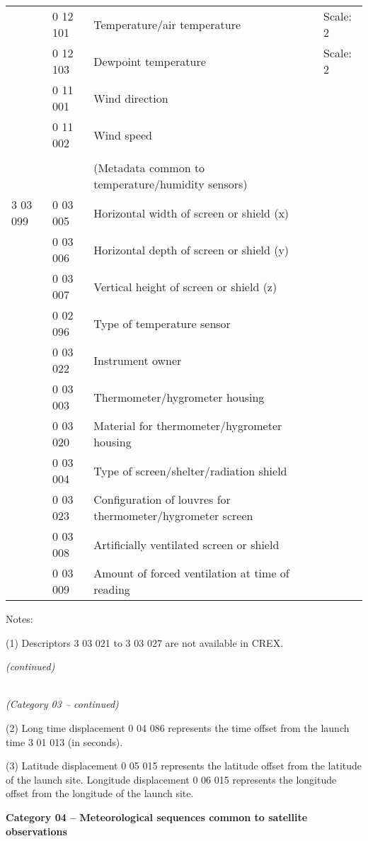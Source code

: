 \begin{longtable}[]{@{}llll@{}}
& 0 12 101 & Temperature/air temperature & Scale: 2\tabularnewline
& 0 12 103 & Dewpoint temperature & Scale: 2\tabularnewline
& 0 11 001 & Wind direction &\tabularnewline
& 0 11 002 & Wind speed &\tabularnewline
& & &\tabularnewline
& & (Metadata common to temperature/humidity sensors) &\tabularnewline
3 03 099 & 0 03 005 & Horizontal width of screen or shield (x) &\tabularnewline
& 0 03 006 & Horizontal depth of screen or shield (y) &\tabularnewline
& 0 03 007 & Vertical height of screen or shield (z) &\tabularnewline
& 0 02 096 & Type of temperature sensor &\tabularnewline
& 0 03 022 & Instrument owner &\tabularnewline
& 0 03 003 & Thermometer/hygrometer housing &\tabularnewline
& 0 03 020 & Material for thermometer/hygrometer housing &\tabularnewline
& 0 03 004 & Type of screen/shelter/radiation shield &\tabularnewline
& 0 03 023 & Configuration of louvres for thermometer/hygrometer screen &\tabularnewline
& 0 03 008 & Artificially ventilated screen or shield &\tabularnewline
& 0 03 009 & Amount of forced ventilation at time of reading &\tabularnewline
\bottomrule
\end{longtable}

Notes:

(1) Descriptors 3 03 021 to 3 03 027 are not available in CREX.

\emph{(continued)}

\emph{\\
(Category 03 -- continued)}

(2) Long time displacement 0 04 086 represents the time offset from the launch time 3 01 013 (in seconds).

(3) Latitude displacement 0 05 015 represents the latitude offset from the latitude of the launch site. Longitude displacement 0 06 015 represents the longitude offset from the longitude of the launch site.

\textbf{Category 04 -- Meteorological sequences common to satellite observations}

